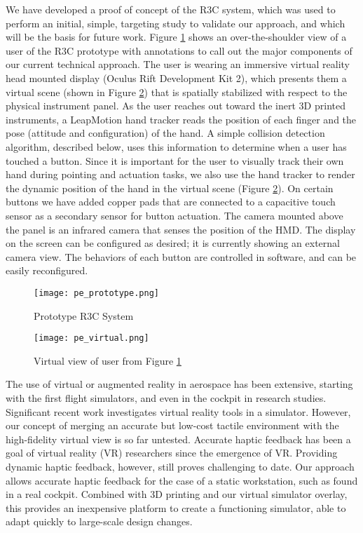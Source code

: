 We have developed a proof of concept of the R3C system, which was used to perform an initial, simple, targeting study to validate our approach, and which will be the basis for future work.
Figure \ref{fig:pe_prototype} shows an over-the-shoulder view of a user of the R3C prototype with annotations to call out the major components of our current technical approach.
The user is wearing an immersive virtual reality head mounted display (Oculus Rift Development Kit 2), which presents them a virtual scene (shown in Figure \ref{fig:pe_virtual}) that is spatially stabilized with respect to the physical instrument panel.
As the user reaches out toward the inert 3D printed instruments, a LeapMotion hand tracker reads the position of each finger and the pose (attitude and configuration) of the hand.
A simple collision detection algorithm, described below, uses this information to determine when a user has touched a button.
Since it is important for the user to visually track their own hand during pointing and actuation tasks, we also use the hand tracker to render the dynamic position of the hand in the virtual scene (Figure \ref{fig:pe_virtual}).
On certain buttons we have added copper pads that are connected to a capacitive touch sensor as a secondary sensor for button actuation.
The camera mounted above the panel is an infrared camera that senses the position of the HMD.
The display on the screen can be configured as desired; it is currently showing an external camera view.
The behaviors of each button are controlled in software, and can be easily reconfigured.

\begin{figure}
    \centering
    \texttt{[image: pe\_prototype.png]}
    \caption{Prototype R3C System}
    \label{fig:pe_prototype}
\end{figure}
\begin{figure}
    \centering
    \texttt{[image: pe\_virtual.png]}
    \caption{Virtual view of user from Figure \ref{fig:pe_prototype}}
    \label{fig:pe_virtual}
\end{figure}

The use of virtual or augmented reality in aerospace has been extensive, starting with the first flight simulators, and even in the cockpit in research studies\cite{foyle_taxiway_1996, bachelder_fused_2013}.
Significant recent work investigates virtual reality tools in a simulator\cite{h._wan_mrstudio:_2011, i._yavrucuk_low_2011, t._aslandere_virtual_2015}.
However, our concept of merging an accurate but low-cost tactile environment with the high-fidelity virtual view is so far untested.
Accurate haptic feedback has been a goal of virtual reality (VR) researchers since the emergence of VR.
Providing dynamic haptic feedback, however, still proves challenging to date\cite{stone_haptic_2001,lecuyer_simulating_2009}.
Our approach allows accurate haptic feedback for the case of a static workstation, such as found in a real cockpit.
Combined with 3D printing and our virtual simulator overlay, this provides an inexpensive platform to create a functioning simulator, able to adapt quickly to large-scale design changes.

